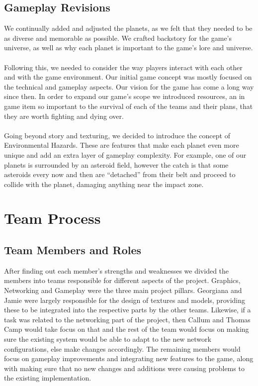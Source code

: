 \documentclass[11pt,a4paper]{article}
\begin{document}
        \subsection{Gameplay Revisions}
        We continually added and adjusted the planets, as we felt that they needed to be as diverse and memorable as possible. We crafted backstory for the game's universe, as well as why each planet is important to the game's lore and universe. \\ \\ 
        Following this, we needed to consider the way players interact with each other and with the game environment. Our initial game concept was mostly focused on the technical and gameplay aspects. Our vision for the game has come a long way since then. In order to expand our game's scope we introduced resources, an in game item so important to the survival of each of the teams and their plans, that they are worth fighting and dying over. \\ \\
        Going beyond story and texturing, we decided to introduce the concept of Environmental Hazards. These are features that make each planet even more unique and add an extra layer of gameplay complexity. For example, one of our planets is surrounded by an asteroid field, however the catch is that some asteroids every now and then are “detached” from their belt and proceed to collide with the planet, damaging anything near the impact zone.

        \section{Team Process}
        
        \subsection{Team Members and Roles}

After finding out each member's strengths and weaknesses we divided the members into teams responsible for different aspects of the project. Graphics, Networking and Gameplay were the three main project pillars. Georgiana and Jamie were largely responsible for the design of textures and models, providing these to be integrated into the respective parts by the other teams. Likewise, if a task was related to the networking part of the project, then Callum and Thomas Camp would take focus on that and the rest of the team would focus on making sure the existing system would be able to adapt to the new network configurations, else make changes accordingly. The remaining members would focus on gameplay improvements and integrating new features to the game, along with making sure that no new changes and additions were causing problems to the existing implementation.
         
\end{document}

